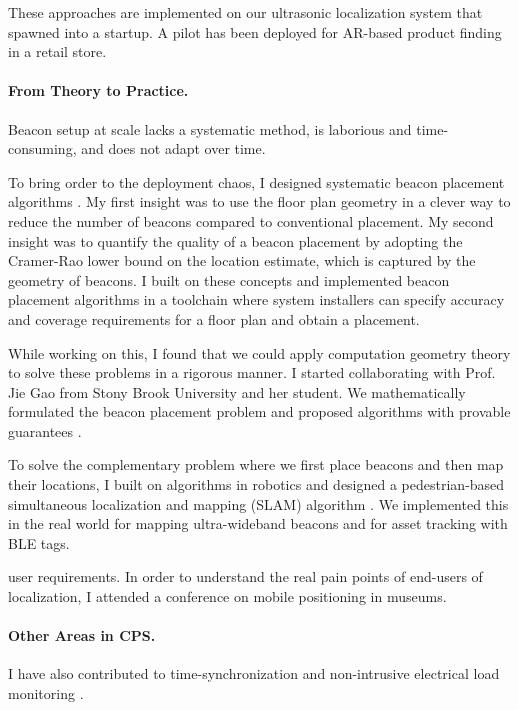 \documentclass[10pt]{article}
\begin{document}
These approaches are implemented on our ultrasonic localization system that spawned into a startup. A pilot has been deployed for AR-based product finding in a retail store. 

\paragraph{From Theory to Practice.  }
Beacon setup at scale lacks a systematic method, is laborious and time-consuming, and does not adapt over time. %

To bring order to the deployment chaos, I designed systematic beacon placement algorithms \cite{rajagopal2016beacon}. 
My first insight was to use the floor plan geometry in a clever way to reduce the number of beacons compared to conventional placement. 
My second insight was to quantify the quality of a beacon placement by adopting the Cramer-Rao lower bound on the location estimate, which is captured by the geometry of beacons. I built on these concepts and implemented beacon placement algorithms in a toolchain where system installers can specify accuracy and coverage requirements for a floor plan and obtain a placement. 

While working on this, I found that we could apply computation geometry theory to solve these problems in a rigorous manner.  
I started collaborating with Prof. Jie Gao from Stony Brook University and her student. 
We mathematically formulated the beacon placement problem and proposed algorithms with provable guarantees \cite{beaconplacementtheory}.  

To solve the complementary problem where we first place beacons and then map their locations, I built on algorithms in robotics and designed a pedestrian-based simultaneous localization and mapping (SLAM) algorithm \cite{mobileAR}. We implemented this in the real world for mapping ultra-wideband beacons and for asset tracking with BLE tags. 

user requirements. In order to understand the real pain points of end-users of localization, I attended a conference on mobile positioning in museums. 

\paragraph{Other Areas in CPS. }
I have also contributed to time-synchronization \cite{buevich2013hardware, dongare2017pulsar} and non-intrusive electrical load
monitoring \cite{rajagopal2013magnetic, rajagopal2013demo}.
\end{document}
